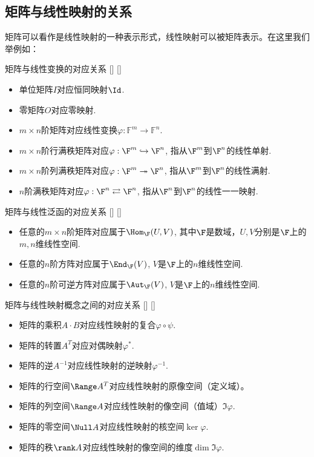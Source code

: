 \documentclass[UTF8]{ctexart}
\begin{document}
	\subsection{矩阵与线性映射的关系}
		矩阵可以看作是线性映射的一种表示形式，线性映射可以被矩阵表示。在这里我们举例如：
		\begin{xmp}
			[]
			{矩阵与线性变换的对应关系}
			[]
			[]

			\begin{itemize}
				\item 单位矩阵$I$对应恒同映射$\Id$.
				\item 零矩阵$O$对应零映射.
				\item $m\times n$阶矩阵对应线性变换$\varphi : \mathbb F^m \to \mathbb F^n$.
				\item $m\times n$阶行满秩矩阵对应$\varphi:\F^m\hookrightarrow \F^n$, 指从$\F^m$到$\F^n$的线性单射.
				\item $m\times n$阶列满秩矩阵对应$\varphi:\F^m\twoheadrightarrow \F^n$, 指从$\F^m$到$\F^n$的线性满射.
				\item $n$阶满秩矩阵对应$\varphi:\F^n\rightleftarrows \F^n$, 指从$\F^n$到$\F^n$的线性一一映射.
			\end{itemize}
		\end{xmp}

		\begin{xmp}
			[]
			{矩阵与线性泛函的对应关系}
			[]
			[]

			\begin{itemize}
				\item 任意的$m\times n$阶矩阵对应属于$\Hom_{\F}(U,V)$, 其中$\F$是数域，$U,V$分别是$\F$上的$m,n$维线性空间.
				\item 任意的$n$阶方阵对应属于$\End_{\F}(V)$, $V$是$\F$上的$n$维线性空间.
				\item 任意的$n$阶可逆方阵对应属于$\Aut_{\F}(V)$, $V$是$\F$上的$n$维线性空间.
			\end{itemize}
		\end{xmp}

		\begin{xmp}
			[]
			{矩阵与线性映射概念之间的对应关系}
			[]
			[]

			\begin{itemize}
				\item 矩阵的乘积$A\cdot B$对应线性映射的复合$\varphi\circ\psi$.
				\item 矩阵的转置$A^T$对应对偶映射$\varphi^*$.
				\item 矩阵的逆$A^{-1}$对应线性映射的逆映射$\varphi^{-1}$.
				\item 矩阵的行空间$\Range A^T$对应线性映射的原像空间（定义域）。
				\item 矩阵的列空间$\Range A$对应线性映射的像空间（值域）$\Im\varphi$.
				\item 矩阵的零空间$\Null A$对应线性映射的核空间$\ker \varphi$.
				\item 矩阵的秩$\rank A$对应线性映射的像空间的维度$\dim\Im\varphi$.
			\end{itemize}
		\end{xmp}
\end{document}
